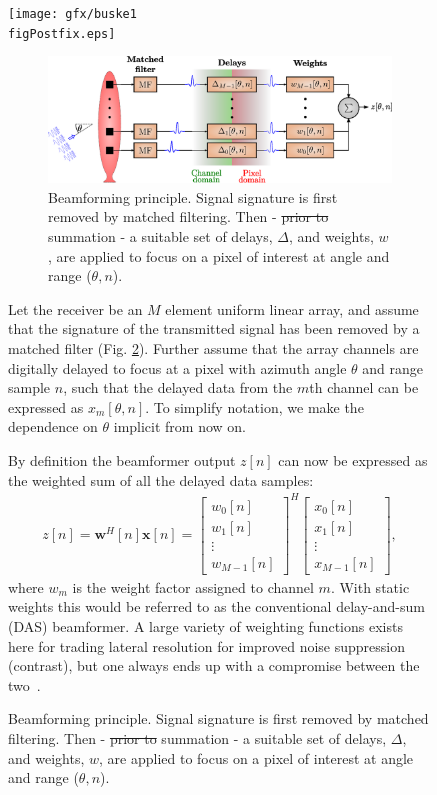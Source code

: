 \documentclass[12pt,journal,draftclsnofoot,onecolumn]{IEEEtran}
\let\MYoriglatexcaption\caption               %
\renewcommand{\caption}[2][\relax]{\MYoriglatexcaption[#2]{#2}}
\newcommand\bmat[1]{\begin{bmatrix}#1\end{bmatrix}}
\renewcommand\H{^{\scriptscriptstyle H}}
\renewcommand\vec[1]{\boldsymbol{#1}}
\newcommand\1{\vec 1}
\newcommand*\w{\vec w}
\newcommand*\x{\vec x}
\providecommand{\DIFaddtex}[1]{{\protect\color{blue}\uwave{#1}}} %
\providecommand{\DIFdeltex}[1]{{\protect\color{red}\sout{#1}}}                      %
\providecommand{\DIFaddFL}[1]{\DIFadd{#1}} %
\providecommand{\DIFdelFL}[1]{\DIFdel{#1}} %
\providecommand{\DIFaddbeginFL}{} %
\providecommand{\DIFaddendFL}{} %
\providecommand{\DIFdelbeginFL}{} %
\providecommand{\DIFdelendFL}{} %
\providecommand{\DIFadd}[1]{\texorpdfstring{\DIFaddtex{#1}}{#1}} %
\providecommand{\DIFdel}[1]{\texorpdfstring{\DIFdeltex{#1}}{}} %
\begin{document}
\ifPeerReview
\begin{figure}
[H]\centering
\DIFdelbeginFL %
\DIFdelendFL \DIFaddbeginFL \texttt{[image: gfx/buske1\\figPostfix.eps]}
\DIFaddendFL \else
\begin{figure}
[!t]\centering
\includegraphics[width=\linewidth]{gfx/beamforming.eps}
\fi%
\caption{Beamforming principle. Signal signature is first removed by matched filtering. Then - \DIFdelbeginFL \DIFdelFL{prior to }\DIFdelendFL \DIFaddbeginFL \DIFaddFL{before }\DIFaddendFL summation - a suitable set of delays, $\Delta$, and weights, $w$, are applied to focus on a pixel of interest at angle and range ($\theta,n$).}\label{beamforming}
\end{figure}
Let the receiver be an $M$ element uniform linear array, and assume that the signature of the transmitted signal has been removed by a matched filter (Fig. \ref{beamforming}). Further assume that the array channels are digitally delayed to focus at a pixel with azimuth angle $\theta$ and range sample $n$, such that the delayed data from the $m$th channel can be expressed as $x_m[\theta,n]$. To simplify notation, we make the dependence on $\theta$ implicit from now on. 

By definition the beamformer output $z[n]$ can now be expressed as the weighted sum of all the delayed data samples:
\begin{align}
z[n] = \w\H[n]\x[n] = \bmat{w_0[n]\\w_1[n]\\\vdots\\w_{M-1}[n]}^H \bmat{x_0[n]\\x_1[n]\\\vdots\\x_{M-1}[n]},\label{z}
\end{align}
where $w_m$ is the weight factor assigned to channel $m$. With static weights this would be referred to as the conventional delay-and-sum (DAS) beamformer. A large variety of weighting functions exists here for trading lateral resolution for improved noise suppression (contrast), but one always ends up with a compromise between the two~\cite{Harris1978}.


\end{figure}
\end{document}
